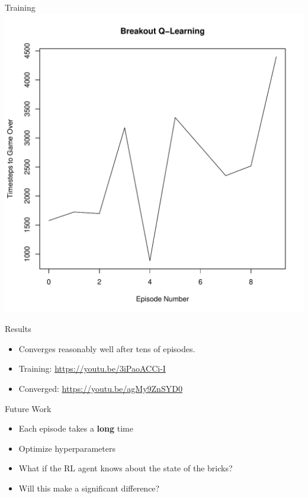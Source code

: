 \documentclass{beamer}
\begin{document}
\begin{frame}{Training}
  \centering
  \includegraphics[scale=0.45]{breakout-learn.pdf}
\end{frame}



\begin{frame}{Results}
  \begin{itemize}
    \item Converges reasonably well after tens of episodes.
  \end{itemize}
  \vspace{2em}
  \begin{itemize}
    \item Training: \url{https://youtu.be/3iPaoACCi-I}
    \item Converged: \url{https://youtu.be/agMy9ZnSYD0}
  \end{itemize}
\end{frame}

\begin{frame}{Future Work}
  \begin{itemize}
    \item Each episode takes a \textbf{long} time
    \item Optimize hyperparameters
  \end{itemize}
  \vspace{2em}
  \begin{itemize}
    \item What if the RL agent knows about the state of the bricks?
    \item Will this make a significant difference?
  \end{itemize}
\end{frame}
\end{document}
